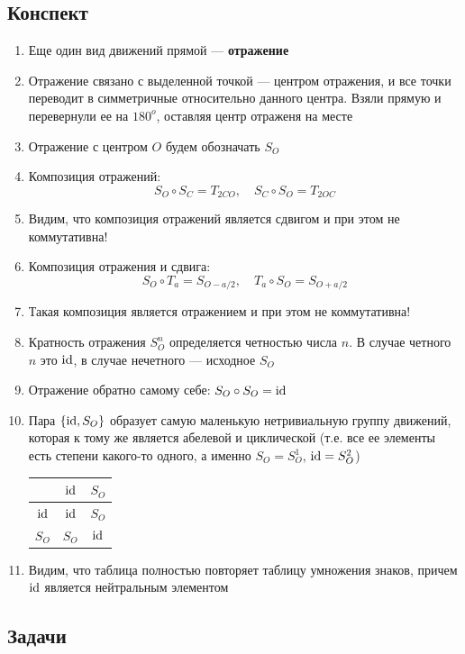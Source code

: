 \subsection{Конспект}
\begin{enumerate}\setlength{\itemsep}{1pt}
\item Еще один вид движений прямой --- \textbf{отражение}
\item Отражение связано с выделенной точкой --- центром отражения, и все точки переводит в симметричные относительно данного центра. Взяли прямую и перевернули ее на $180^o$, оставляя центр отраженя на месте
\item Отражение с центром $O$ будем обозначать $S_O$
\item Композиция отражений: $$S_O\circ S_C=T_{2CO},\quad S_C\circ S_O=T_{2OC}$$
\item Видим, что композиция отражений является сдвигом и при этом не коммутативна!
\item Композиция отражения и сдвига: $$S_O\circ T_a = S_{O-a/2},\quad T_a\circ S_O = S_{O+a/2}$$
\item Такая композиция является отражением и при этом не коммутативна!
\item Кратность отражения $S_O^n$ определяется четностью числа $n$. В случае четного $n$ это $\mathrm{id}$, в случае нечетного --- исходное $S_O$
\item Отражение обратно самому себе: $S_O\circ S_O=\mathrm{id}$
\item Пара $\{\mathrm{id}, S_O\}$ образует самую маленькую нетривиальную группу движений, которая к тому же является абелевой и циклической (т.е. все ее элементы есть степени какого-то одного, а именно $S_O=S_O^1$, $\mathrm{id}=S_O^2$)
\begin{table}[htb!]\begin{center}
\begin{tabular}{c|c|c|}
  & $\mathrm{id}$ & $S_O$ \\
 \hline
$\mathrm{id}$ & $\mathrm{id}$ & $S_O$ \\
 \hline
$S_O$ & $S_O$ & $\mathrm{id}$ \\
\hline
\end{tabular}
\end{center}\end{table}
\item Видим, что таблица полностью повторяет таблицу умножения знаков, причем $\mathrm{id}$ является нейтральным элементом
\end{enumerate}
\subsection{Задачи}



